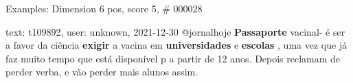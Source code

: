 \begin{frame}{Examples: Dimension 6 pos, score 5, \# 000028}
\footnotesize
\begin{exampleblock}{text: t109892, user: unknown, 2021-12-30}
@jornalhoje \textbf{Passaporte} vacinal- é ser a favor da ciência 
\textbf{exigir} a vacina em \textbf{universidades} e \textbf{escolas} , uma vez 
que já faz muito tempo que está disponível p a partir de 12 anos. Depois 
reclamam de perder verba, e vão perder mais alunos assim. 
\end{exampleblock}
\end{frame}
